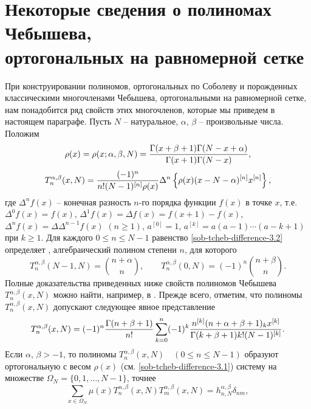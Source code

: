\section{Некоторые сведения о полиномах Чебышева,\\ ортогональных на равномерной  сетке} \label{sob-tcheb-difference-s3}
При конструировании полиномов, ортогональных по Соболеву и порожденных классическими многочленами Чебышева, ортогональными на равномерной сетке, нам понадобится ряд свойств этих многочленов, которые мы приведем в настоящем параграфе.
 Пусть $N$ -- натуральное, $\alpha$, $\beta$ -- произвольные  числа. Положим
\begin{equation}
\rho(x)=\rho(x;\alpha,\beta,N)={\Gamma(x+\beta+1)
\Gamma(N-x+\alpha)\over \Gamma(x+1)\Gamma(N-x)}, \label{sob-tcheb-difference-3.1}
\end{equation}
\begin{equation}\label{sob-tcheb-difference-3.2}
T_n^{\alpha,\beta}(x,N)={(-1)^n\over n!(N-1)^{[n]}\rho(x)}\Delta^n
\left\{\rho(x)(x-N-\alpha)^{[n]}x^{[n]}\right\},
\end{equation}
 где $\Delta^nf(x)$ -- конечная разность $n$-го порядка функции
     $f(x)$ в точке $x$, т.е. $\Delta^0f(x)=f(x)$,
$\Delta^1f(x)=\Delta f(x)=f(x+1)-f(x)$, $\Delta^nf(x)=\Delta
\Delta^{n-1}f(x)$ $(n\ge1)$, $a^{[0]}=1$,
$a^{[k]}=a(a-1)\cdots(a-k+1)$ при $k\ge1$. Для каждого $0\le n\le
N-1$ равенство \eqref{sob-tcheb-difference-3.2} определяет \cite{sob-tcheb-difference-Cheb5}, алгебраический полином степени $n$,   для которого
$$
T_n^{\alpha,\beta}(N-1,N)={n+\alpha\choose n},\qquad
T_n^{\alpha,\beta}(0,N)=(-1)^n{n+\beta\choose n}.
$$
Полные доказательства приведенных ниже свойств полиномов Чебышева $T_n^{\alpha,\beta}(x,N)$
можно найти, например, в  \cite{sob-tcheb-difference-Shar18}. Прежде всего, отметим, что полиномы  $T_n^{\alpha,\beta}(x,N)$ допускают  следующее явное представление
\begin{equation}
T_n^{\alpha,\beta}(x,N)=(-1)^n{\Gamma(n+\beta+1)\over
n!}\sum_{k=0}^n(-1)^k {n^{[k]}(n+\alpha+\beta+1)_kx^{[k]}\over
\Gamma(k+\beta+1) k!(N-1)^{[k]}}. \label{sob-tcheb-difference-3.3}
\end{equation}
Если $\alpha$,
$\beta>-1$, то полиномы $T_n^{\alpha,\beta}(x,N)\quad (0\le n\le
N-1)$ образуют ортогональную  с весом $\rho(x)$ (см. \eqref{sob-tcheb-difference-3.1}) систему  на множестве
$\Omega_N=\{0,1,\ldots,N-1\}$, точнее
\begin{equation}
\sum_{x\in\Omega_N}\mu(x)T_n^{\alpha,\beta}(x,N)T_m^{\alpha,\beta}(x,N)
=h_{n,N}^{\alpha,\beta}\delta_{nm},\label{sob-tcheb-difference-3.4}
\end{equation}

